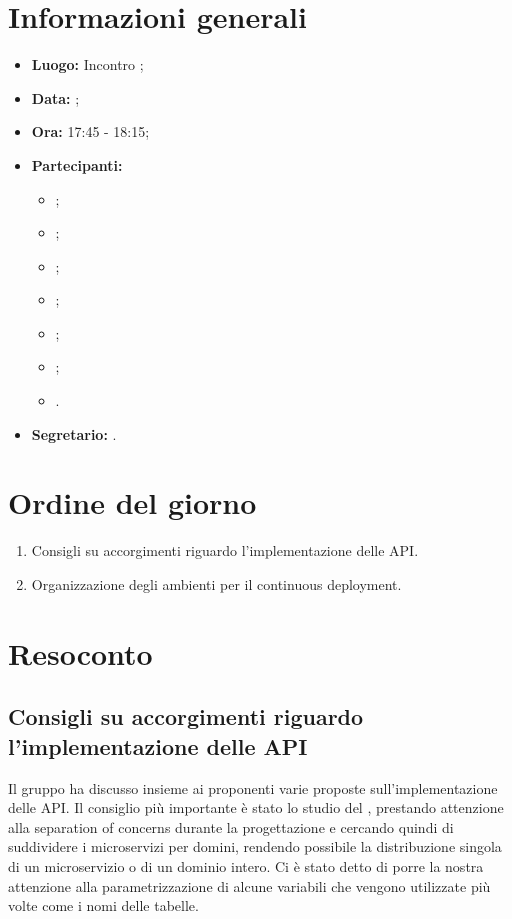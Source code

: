 \section{Informazioni generali}
\begin{itemize}
\item \textbf{Luogo:} Incontro ;
\item \textbf{Data:} \Data;
\item \textbf{Ora:} 17:45 - 18:15;
\item \textbf{Partecipanti:}
	\begin{itemize}
		\item \BL{}; 
		\item \FF{};
		\item \MM{};
		\item \PC{};
		\item \TG{};
		\item \TL{};
		\item \Proponente{}.
	\end{itemize}
\item \textbf{Segretario:} \MM{}.
\end{itemize}

\section{Ordine del giorno}
\begin{enumerate}
	\item Consigli su accorgimenti riguardo l'implementazione delle API.
	\item Organizzazione degli ambienti per il continuous deployment.
\end{enumerate}

\section{Resoconto}
\subsection{Consigli su accorgimenti riguardo l'implementazione delle API}
Il gruppo ha discusso insieme ai proponenti varie proposte sull'implementazione delle API. Il consiglio più importante è stato lo studio del , prestando attenzione alla separation of concerns durante la progettazione e cercando quindi di suddividere i microservizi per domini, rendendo possibile la distribuzione singola di un microservizio o di un dominio intero. Ci è stato detto di porre la nostra attenzione alla parametrizzazione di alcune variabili che vengono utilizzate più volte come i nomi delle tabelle.

